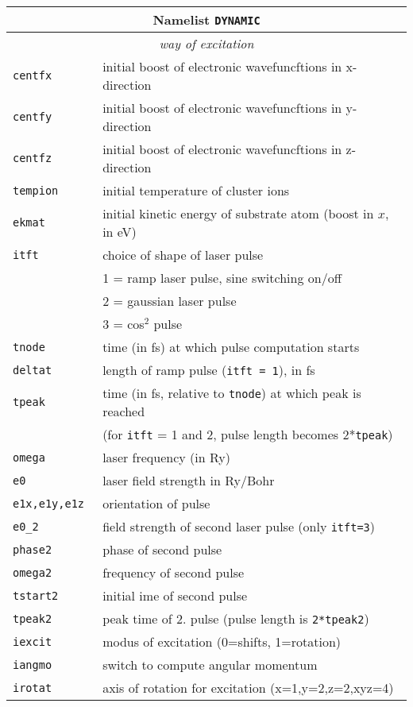 \documentclass[12pt]{article}
\begin{document}
\begin{enumerate}
\begin{tabular}{ll}
\hline
\multicolumn{2}{c}{Namelist {\tt DYNAMIC}} in {\tt for005.<name>} \\
\hline
\multicolumn{2}{c}{\it way of excitation} \\
\hline
{\tt centfx           }& initial boost of electronic wavefuncftions in x-direction\\
{\tt centfy           }& initial boost of electronic wavefuncftions in y-direction\\
{\tt centfz           }& initial boost of electronic wavefuncftions in z-direction\\
{\tt tempion          }& initial temperature of cluster ions \\
{\tt ekmat} & initial kinetic energy of substrate atom (boost in $x$, in eV)\\
{\tt itft   }& choice of shape of laser pulse \\
&   1 = ramp laser pulse, sine switching on/off\\
&   2 = gaussian laser pulse \\
&   3 = cos$^2$ pulse\\
{\tt tnode  }& time (in fs) at which pulse computation starts\\
{\tt deltat }& length of ramp pulse ({\tt itft = 1}), in fs\\
{\tt tpeak  }& time (in fs, relative to {\tt tnode}) at which peak is reached\\
& (for {\tt itft} = 1 and 2, pulse length becomes 2*{\tt tpeak})\\
{\tt omega  }& laser frequency (in Ry)\\
{\tt e0     }& laser field strength in Ry/Bohr\\
{\tt e1x,e1y,e1z   }& orientation of pulse\\
{\tt e0\_2  }& field strength of second laser pulse (only {\tt itft=3}) \\
{\tt phase2 }& phase of second pulse \\
{\tt omega2 }& frequency of second pulse\\
{\tt tstart2}& initial ime of second pulse\\
{\tt tpeak2} & peak time of 2. pulse (pulse length is {\tt 2*tpeak2})\\
{\tt iexcit} & modus of excitation (0=shifts, 1=rotation)\\
{\tt iangmo} & switch to compute angular momentum\\
{\tt irotat} & axis of rotation for excitation (x=1,y=2,z=2,xyz=4)\\

\end{tabular}
\end{enumerate}
\end{document}

